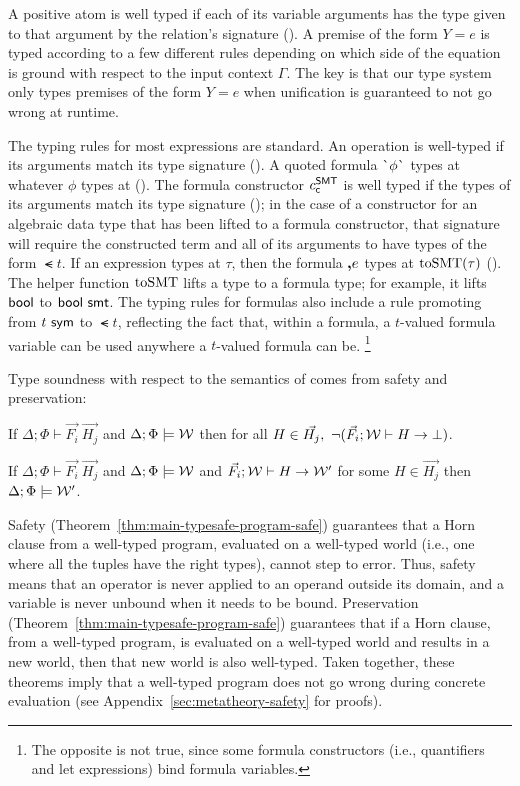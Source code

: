 \documentclass[acmsmall,screen,nonacm]{acmart}
\theoremstyle{definition}
\begin{document}
A positive atom is well typed if each of its variable arguments has the type
given to that argument by the relation's signature ().
A premise of the form $Y = e$ is typed according to a few different rules
depending on which side of the equation is ground with respect to the input
context $\Gamma$.
The key is that our type system only types premises of the form $Y = e$ when
unification is guaranteed to not go wrong at runtime.

The typing rules for most expressions are standard.
An operation is well-typed if its arguments match its type signature
().
A quoted formula $\textsf{\`{}}{\phi}\textsf{\`{}}$ types at whatever $\phi$ types at
().
The formula constructor $c^\mathsf{SMT}_{\mathsf{c}}$ is well typed if the types of its arguments
match its type signature (); in the case of a constructor for
an algebraic data type that has been lifted to a formula constructor, that
signature will require the constructed term and all of its arguments to have
types of the form $\smt{t}$.
If an expression types at $\tau$, then the formula $\textbf{,}{e}$ types at
$\mathrm{toSMT}(\tau)$ ().
The helper function $\mathrm{toSMT}$ lifts a type to a formula type; for example, it
lifts $\mathsf{bool}$ to ${\mathsf{bool}} ~ \mathsf{smt}$.
The typing rules for formulas also include a rule promoting from ${t} ~ \mathsf{sym}$ to
$\smt{t}$, reflecting the fact that, within a formula, a $t$-valued formula
variable can be used anywhere a $t$-valued formula can be.%
\footnote{The opposite is not true, since some formula constructors (i.e.,
quantifiers and let expressions) bind formula variables.}

Type soundness with respect to the semantics of \Name comes from safety and
preservation:
%
\begin{theorem}[Safety]
\label{thm:main-typesafe-program-safe}
  If $\Delta; \Phi \vdash \vec{F_i} ~ \vec{H_j}$ and $\Delta; \Phi \models \mathcal{W}$ then
%
  for all $H \in \vec{H_j}, ~ \neg (\vec{F_i}; \mathcal{W} \vdash H \rightarrow \bot)$.
%
\end{theorem}%
%
\begin{theorem}[Preservation]
\label{thm:main-typesafe-program-pres}
  If $\Delta; \Phi \vdash \vec{F_i} ~ \vec{H_j}$ and $\Delta; \Phi \models \mathcal{W}$ and
%
  $\vec{F_i}; \mathcal{W} \vdash H \rightarrow \mathcal{W}'$ for some $H \in \vec{H_j}$ then
%
  $\Delta; \Phi \models \mathcal{W}'$.
%
\end{theorem}%
%
Safety (Theorem~\ref{thm:main-typesafe-program-safe}) guarantees that a Horn
clause from a well-typed program, evaluated on a well-typed world (i.e., one
where all the tuples have the right types), cannot step to error.
Thus, safety means that an operator is never applied to an operand outside its
domain, and a variable is never unbound when it needs to be bound. 
Preservation (Theorem~\ref{thm:main-typesafe-program-safe}) guarantees that if
a Horn clause, from a well-typed program, is evaluated on a well-typed world
and results in a new world, then that new world is also well-typed.
Taken together, these theorems imply that a well-typed \Name program does not
go wrong during concrete evaluation\iffull{} (see Appendix~\ref{sec:metatheory-safety}
for proofs)\fi.
\end{document}
